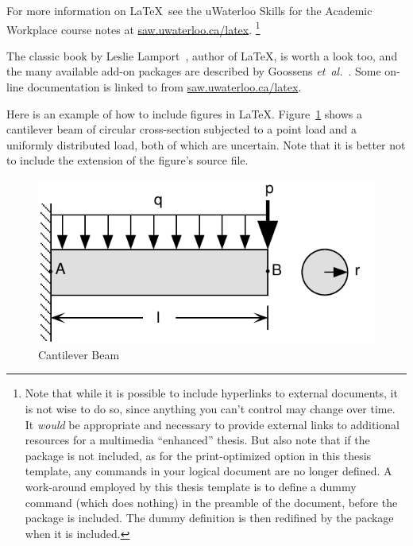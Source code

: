 For more information on \LaTeX\, see the uWaterloo Skills for the Academic Workplace 
course notes at \href{http://saw.uwaterloo.ca/latex}{saw.uwaterloo.ca/latex}. 
\footnote{
Note that while it is possible to include hyperlinks to external documents,
it is not wise to do so, since anything you can't control may change over time. 
It \emph{would} be appropriate and necessary to provide external links to 
additional resources for a multimedia ``enhanced'' thesis. 
But also note that if the  package is not included, 
as for the print-optimized option in this thesis template, any  
commands in your logical document are no longer defined.
A work-around employed by this thesis template is to define a dummy  
command (which does nothing) in the preamble of the document, 
before the  package is included. 
The dummy definition is then redifined by the
 package when it is included.
}

The classic book by Leslie Lamport~\cite{lamport.book}, author of \LaTeX , is worth a look too, and the many available add-on packages are described by 
Goossens \textit{et~al.}~\cite{goossens.book}. Some on-line documentation is linked
to from \href{http://saw.uwaterloo.ca/latex}{saw.uwaterloo.ca/latex}. 



Here is an example of how to include figures in \LaTeX. 
Figure~\ref{fig.beam} shows a cantilever beam of circular cross-section
subjected to a point load and a uniformly distributed load, both of which are uncertain. Note that it is better not to include the extension of the figure's source file.

\begin{figure}[!htbp]
 \begin{center}
  \includegraphics[clip=true]{figs/ipe/beam}
 \end{center}
\caption{Cantilever Beam}
\label{fig.beam}
\end{figure}



